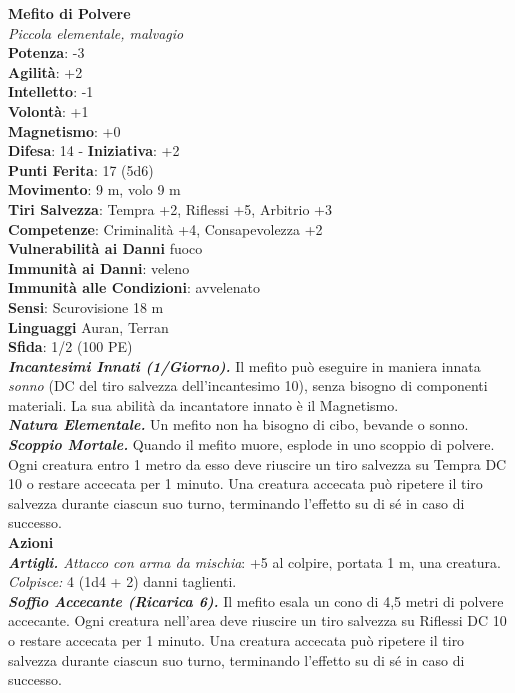 \begin{multicols}{2}
\medskip\textbf{Mefito di Polvere}\\
\emph{Piccola elementale, malvagio}\\
\textbf{Potenza}: -3\\
\textbf{Agilità}: +2\\
\textbf{Intelletto}: -1\\
\textbf{Volontà}: +1\\
\textbf{Magnetismo}: +0\\
\textbf{Difesa}: 14 - \textbf{Iniziativa}: +2\\
\textbf{Punti Ferita}: 17 (5d6)\\
\textbf{Movimento}: 9 m, volo 9 m\\
\textbf{Tiri Salvezza}: Tempra +2, Riflessi +5, Arbitrio +3\\
\textbf{Competenze}: Criminalità +4, Consapevolezza +2\\
\textbf{Vulnerabilità ai Danni} fuoco\\
\textbf{Immunità ai Danni}: veleno\\
\textbf{Immunità alle Condizioni}: avvelenato\\
\textbf{Sensi}: Scurovisione 18 m\\
\textbf{Linguaggi} Auran, Terran\\
\textbf{Sfida}: 1/2 (100 PE)\smallskip\\
\emph{\textbf{Incantesimi Innati (1/Giorno).}} Il mefito può eseguire in maniera innata \emph{sonno} (DC del tiro salvezza dell'incantesimo 10), senza bisogno di componenti materiali. La sua abilità da incantatore innato è il Magnetismo.\\
\emph{\textbf{Natura Elementale.}} Un mefito non ha bisogno di cibo, bevande o sonno.\\
\emph{\textbf{Scoppio Mortale.}} Quando il mefito muore, esplode in uno scoppio di polvere. Ogni creatura entro 1 metro da esso deve riuscire un tiro salvezza su Tempra DC 10 o restare accecata per 1 minuto. Una creatura accecata può ripetere il tiro salvezza durante ciascun suo turno, terminando l'effetto su di sé in caso di successo. \\
\smallskip\textbf{Azioni}\\
\emph{\textbf{Artigli.} Attacco con arma da mischia}: +5 al colpire, portata 1 m, una creatura.\\
\emph{Colpisce:} 4 (1d4 + 2) danni taglienti.\\
\emph{\textbf{Soffio Accecante (Ricarica 6).}} Il mefito esala un cono di 4,5 metri di polvere accecante. Ogni creatura nell'area deve riuscire un tiro salvezza su Riflessi DC 10 o restare accecata per 1 minuto. Una creatura accecata può ripetere il tiro salvezza durante ciascun suo turno, terminando l'effetto su di sé in caso di successo.\\

\end{multicols}
